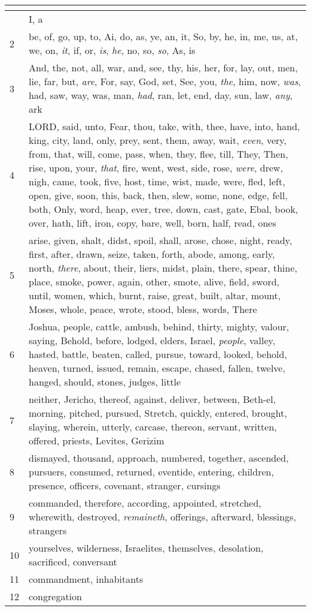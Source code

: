 \begin{center}
\begin{longtable}{l|p{3.75in}}
\hline \multicolumn{2}{c}{{ }} \\ \hline
\endfoot 
1 & I, a\\ \hline 
2 & be, of, go, up, to, Ai, do, as, ye, an, it, So, by, he, in, me, us, at, we, on, \emph{it}, if, or, \emph{is}, \emph{he}, no, so, \emph{so}, As, is\\ \hline 
3 & And, the, not, all, war, and, see, thy, his, her, for, lay, out, men, lie, far, but, \emph{are}, For, say, God, set, See, you, \emph{the}, him, now, \emph{was}, had, saw, way, was, man, \emph{had}, ran, let, end, day, sun, law, \emph{any}, ark\\ \hline 
4 & LORD, said, unto, Fear, thou, take, with, thee, have, into, hand, king, city, land, only, prey, sent, them, away, wait, \emph{even}, very, from, that, will, come, pass, when, they, flee, till, They, Then, rise, upon, your, \emph{that}, fire, went, west, side, rose, \emph{were}, drew, nigh, came, took, five, host, time, wist, made, were, fled, left, open, give, soon, this, back, then, slew, some, none, edge, fell, both, Only, word, heap, ever, tree, down, cast, gate, Ebal, book, over, hath, lift, iron, copy, bare, well, born, half, read, ones\\ \hline 
5 & arise, given, shalt, didst, spoil, shall, arose, chose, night, ready, first, after, drawn, seize, taken, forth, abode, among, early, north, \emph{there}, about, their, liers, midst, plain, there, spear, thine, place, smoke, power, again, other, smote, alive, field, sword, until, women, which, burnt, raise, great, built, altar, mount, Moses, whole, peace, wrote, stood, bless, words, There\\ \hline 
6 & Joshua, people, cattle, ambush, behind, thirty, mighty, valour, saying, Behold, before, lodged, elders, Israel, \emph{people}, valley, hasted, battle, beaten, called, pursue, toward, looked, behold, heaven, turned, issued, remain, escape, chased, fallen, twelve, hanged, should, stones, judges, little\\ \hline 
7 & neither, Jericho, thereof, against, deliver, between, Beth-el, morning, pitched, pursued, Stretch, quickly, entered, brought, slaying, wherein, utterly, carcase, thereon, servant, written, offered, priests, Levites, Gerizim\\ \hline 
8 & dismayed, thousand, approach, numbered, together, ascended, pursuers, consumed, returned, eventide, entering, children, presence, officers, covenant, stranger, cursings\\ \hline 
9 & commanded, therefore, according, appointed, stretched, wherewith, destroyed, \emph{remaineth}, offerings, afterward, blessings, strangers\\ \hline 
10 & yourselves, wilderness, Israelites, themselves, desolation, sacrificed, conversant\\ \hline 
11 & commandment, inhabitants\\ \hline 
12 & congregation\\ \hline 
\end{longtable}
\end{center}





